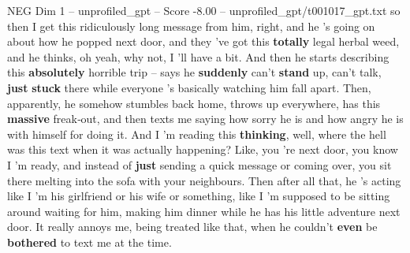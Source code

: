 \begin{textsample}{NEG Dim 1 – unprofiled\_gpt – Score -8.00 – unprofiled\_gpt/t001017\_gpt.txt}  \label{ex:f1_neg_029}
so then I get this ridiculously long message from him, right, and he ’s going on about how he popped next door, and they ’ve got this \textbf{totally} legal herbal weed, and he thinks, oh yeah, why not, I ’ll have a bit.
And then he starts describing this \textbf{absolutely} horrible trip – says he \textbf{suddenly} can't \textbf{stand} up, can't talk, \textbf{just} \textbf{stuck} there while everyone ’s basically watching him fall apart.
Then, apparently, he somehow stumbles back home, throws up everywhere, has this \textbf{massive} freak‑out, and then texts me saying how sorry he is and how angry he is with himself for doing it.
And I ’m reading this \textbf{thinking}, well, where the hell was this text when it was actually happening?
Like, you ’re next door, you know I ’m ready, and instead of \textbf{just} sending a quick message or coming over, you sit there melting into the sofa with your neighbours.
Then after all that, he ’s acting like I ’m his girlfriend or his wife or something, like I ’m supposed to be sitting around waiting for him, making him dinner while he has his little adventure next door.
It really annoys me, being treated like that, when he couldn't \textbf{even} be \textbf{bothered} to text me at the time.

\end{textsample}
